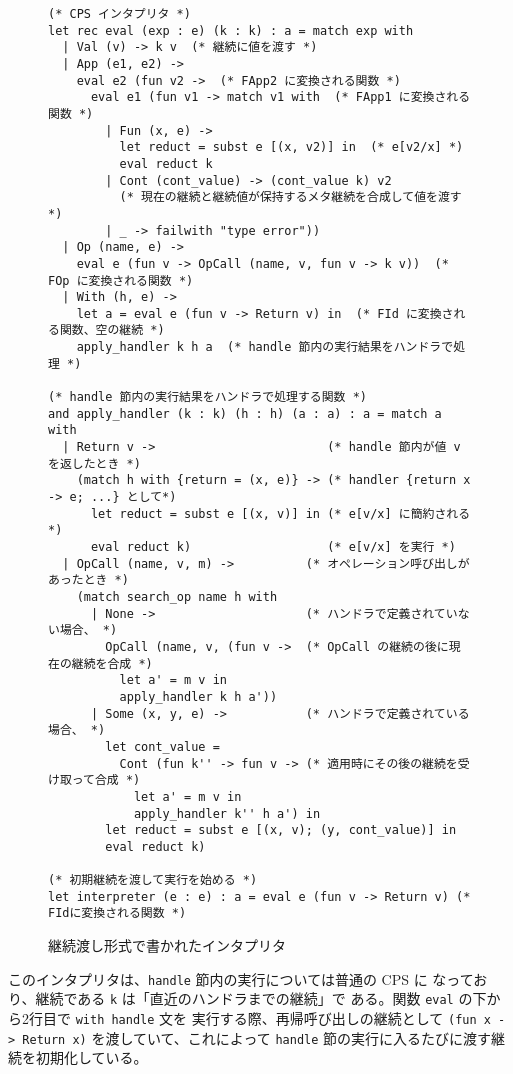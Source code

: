 \begin{figure}
\begin{verbatim}
(* CPS インタプリタ *)
let rec eval (exp : e) (k : k) : a = match exp with
  | Val (v) -> k v  (* 継続に値を渡す *)
  | App (e1, e2) ->
    eval e2 (fun v2 ->  (* FApp2 に変換される関数 *)
      eval e1 (fun v1 -> match v1 with  (* FApp1 に変換される関数 *)
        | Fun (x, e) ->
          let reduct = subst e [(x, v2)] in  (* e[v2/x] *)
          eval reduct k
        | Cont (cont_value) -> (cont_value k) v2
          (* 現在の継続と継続値が保持するメタ継続を合成して値を渡す *)
        | _ -> failwith "type error"))
  | Op (name, e) ->
    eval e (fun v -> OpCall (name, v, fun v -> k v))  (* FOp に変換される関数 *)
  | With (h, e) ->
    let a = eval e (fun v -> Return v) in  (* FId に変換される関数、空の継続 *)
    apply_handler k h a  (* handle 節内の実行結果をハンドラで処理 *)

(* handle 節内の実行結果をハンドラで処理する関数 *)
and apply_handler (k : k) (h : h) (a : a) : a = match a with
  | Return v ->                        (* handle 節内が値 v を返したとき *)
    (match h with {return = (x, e)} -> (* handler {return x -> e; ...} として*)
      let reduct = subst e [(x, v)] in (* e[v/x] に簡約される *)
      eval reduct k)                   (* e[v/x] を実行 *)
  | OpCall (name, v, m) ->          (* オペレーション呼び出しがあったとき *)
    (match search_op name h with
      | None ->                     (* ハンドラで定義されていない場合、 *)
        OpCall (name, v, (fun v ->  (* OpCall の継続の後に現在の継続を合成 *)
          let a' = m v in
          apply_handler k h a'))
      | Some (x, y, e) ->           (* ハンドラで定義されている場合、 *)
        let cont_value =
          Cont (fun k'' -> fun v -> (* 適用時にその後の継続を受け取って合成 *)
            let a' = m v in
            apply_handler k'' h a') in
        let reduct = subst e [(x, v); (y, cont_value)] in
        eval reduct k)

(* 初期継続を渡して実行を始める *)
let interpreter (e : e) : a = eval e (fun v -> Return v) (* FIdに変換される関数 *)
\end{verbatim}
\caption{継続渡し形式で書かれたインタプリタ}
\label{figure:1cps}
\end{figure}

このインタプリタは、\texttt{handle} 節内の実行については普通の CPS に
なっており、継続である \texttt{k} は「直近のハンドラまでの継続」で
ある。関数 \texttt{eval} の下から2行目で \texttt{with handle} 文を
実行する際、再帰呼び出しの継続として
\texttt{(fun x -> Return x)} を渡していて、これによって
\texttt{handle} 節の実行に入るたびに渡す継続を初期化している。

